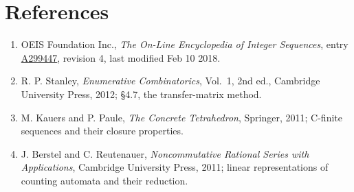 \documentclass[11pt]{article}
\theoremstyle{definition}
\begin{document}
\section{References}

\begin{enumerate}

\item OEIS Foundation Inc., \emph{The On-Line Encyclopedia of Integer Sequences}, entry \href{https://oeis.org/A299447}{A299447}, revision 4, last modified Feb 10 2018.

\item R. P. Stanley, \emph{Enumerative Combinatorics}, Vol.~1, 2nd ed., Cambridge University Press, 2012; \S4.7, the transfer-matrix method.

\item M. Kauers and P. Paule, \emph{The Concrete Tetrahedron}, Springer, 2011; C-finite sequences and their closure properties.

\item J. Berstel and C. Reutenauer, \emph{Noncommutative Rational Series with Applications}, Cambridge University Press, 2011; linear representations of counting automata and their reduction.

\end{enumerate}
\end{document}
